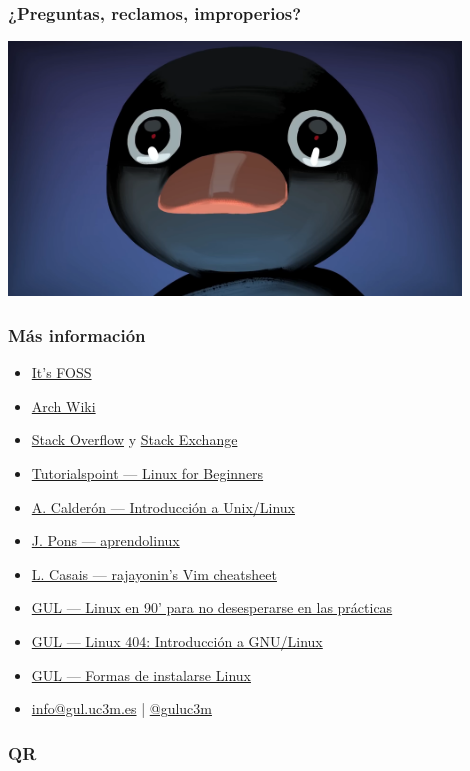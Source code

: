 \documentclass[aspectratio=43]{beamer}
\begin{document}
\begin{frame}
    \frametitle{¿Preguntas, reclamos, improperios?}
    \centering
    \includegraphics[width=0.9\textwidth]{img/noot.png}
\end{frame}



\begin{frame}
    \frametitle{Más información}

    \begin{itemize}
        \item \href{https://itsfoss.com/}{It's FOSS}
        \item \href{https://wiki.archlinux.org/}{Arch Wiki}
        \item \href{https://stackoverflow.com/}{Stack Overflow} y \href{https://stackoverflow.com/}{Stack Exchange}
        \item \href{https://www.tutorialspoint.com/unix/index.htm}{Tutorialspoint — Linux for Beginners}
        \item \href{https://github.com/acaldero/uc3m_linux}{A. Calderón — Introducción a Unix/Linux}
        \item \href{https://aprendolinux.com}{J. Pons — aprendolinux}
        \item \href{https://github.com/rajayonin/cheatsheets/blob/main/vim_cheatsheet.md}{L. Casais — rajayonin's Vim cheatsheet}
        \item \href{https://youtu.be/2qZBUa93MQ8}{GUL — Linux en 90' para no desesperarse en las prácticas}
        \item \href{https://cloud-gul.uc3m.es/s/4qXKozr7DmDSZiN}{GUL — Linux 404: Introducción a GNU/Linux}
        \item \href{https://github.com/guluc3m/linux404/blob/main/README.md}{GUL — Formas de instalarse Linux}
        \item \href{mailto:info@gul.uc3m.es}{info@gul.uc3m.es} | \href{https://twitter.com/guluc3m}{@guluc3m}
    \end{itemize}

\end{frame}


\begin{frame}
    \frametitle{QR}
    
\end{frame}
\end{document}
